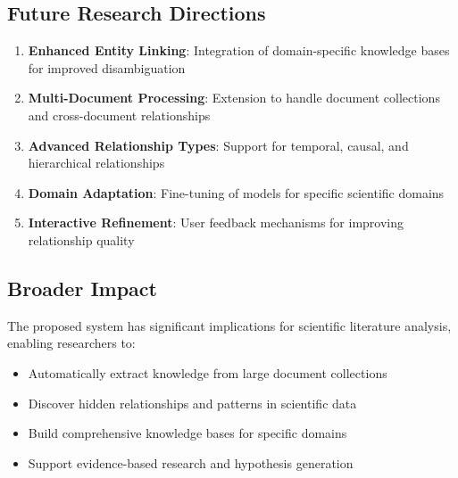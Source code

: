 \documentclass[conference]{IEEEtran}
\begin{document}
\subsection{Future Research Directions}
\begin{enumerate}
\item \textbf{Enhanced Entity Linking}: Integration of domain-specific knowledge bases for improved disambiguation
\item \textbf{Multi-Document Processing}: Extension to handle document collections and cross-document relationships
\item \textbf{Advanced Relationship Types}: Support for temporal, causal, and hierarchical relationships
\item \textbf{Domain Adaptation}: Fine-tuning of models for specific scientific domains
\item \textbf{Interactive Refinement}: User feedback mechanisms for improving relationship quality
\end{enumerate}

\subsection{Broader Impact}
The proposed system has significant implications for scientific literature analysis, enabling researchers to:
\begin{itemize}
\item Automatically extract knowledge from large document collections
\item Discover hidden relationships and patterns in scientific data
\item Build comprehensive knowledge bases for specific domains
\item Support evidence-based research and hypothesis generation
\end{itemize}
\end{document}
